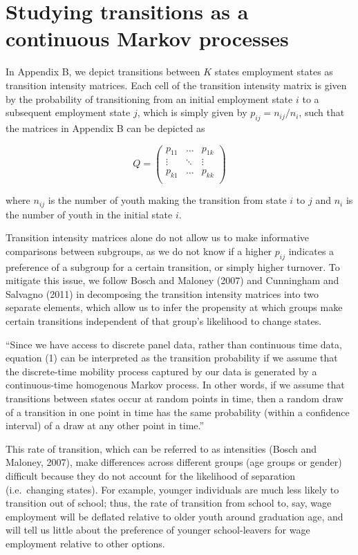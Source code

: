 \documentclass[
  11pt,
a4paper
]{article}
\begin{document}
\newpage

\hypertarget{survey-transitions}{%
\section*{Studying transitions as a continuous Markov processes}\label{survey-transitions}}

In Appendix B, we depict transitions between \(K\) states employment states as transition intensity matrices. Each cell of the transition intensity matrix is given by the probability of transitioning from an initial employment state \(i\) to a subsequent employment state \(j\), which is simply given by \(p_{ij} = n_{ij}/n_i\), such that the matrices in Appendix B can be depicted as

\singlespacing

\[
Q= \begin{pmatrix}
p_{11} & \dots & p_{1k}\\
\vdots & \ddots & \vdots \\
p_{k1} &\dots & p_{kk} \\
\end{pmatrix}
\]
\doublespacing

where \(n_{ij}\) is the number of youth making the transition from state \(i\) to \(j\) and \(n_i\) is the number of youth in the initial state \(i\).

Transition intensity matrices alone do not allow us to make informative comparisons between subgroups, as we do not know if a higher \(p_{ij}\) indicates a preference of a subgroup for a certain transition, or simply higher turnover. To mitigate this issue, we follow Bosch and Maloney (2007) and Cunningham and Salvagno (2011) in decomposing the transition intensity matrices into two separate elements, which allow us to infer the propensity at which groups make certain transitions independent of that group's likelihood to change states.

``Since we have access to discrete panel data, rather than continuous time data, equation (1) can be interpreted as the transition probability if we assume that the discrete-time mobility process captured by our data is generated by a continuous-time homogenous Markov process. In other words, if we assume that transitions between states occur at random points in time, then a random draw of a transition in one point in time has the same probability (within a confidence interval) of a draw at any other point in time.''

This rate of transition, which can be referred to as intensities (Bosch and Maloney, 2007), make differences across different groups (age groups or gender) difficult because they do not account for the likelihood of separation (i.e.~changing states). For example, younger individuals are much less likely to transition out of school; thus, the rate of transition from school to, say, wage employment will be deflated relative to older youth around graduation age, and will tell us little about the preference of younger school-leavers for wage employment relative to other options.
\end{document}
